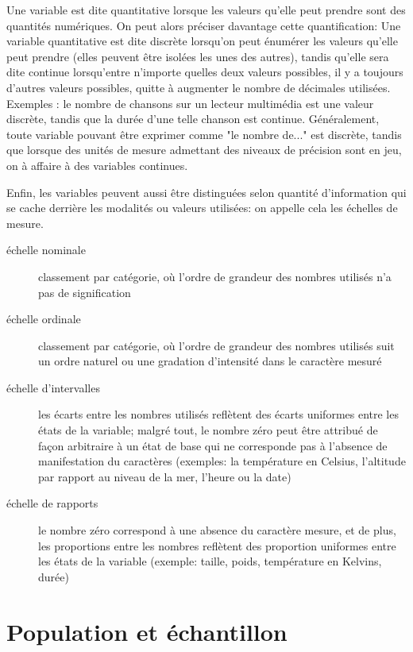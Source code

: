 \documentclass[11pt,fleqn]{book} %
\begin{document}
Une variable est dite quantitative lorsque les valeurs qu’elle peut prendre sont des quantités numériques. On peut alors préciser davantage cette quantification: 
Une variable quantitative est dite discrète lorsqu’on peut énumérer les valeurs qu’elle peut prendre (elles peuvent être isolées les unes des autres), tandis qu'elle sera dite continue lorsqu'entre n'importe quelles deux valeurs possibles, il y a toujours d'autres valeurs possibles, quitte à augmenter le nombre de décimales utilisées. 
Exemples :  le nombre de chansons sur un lecteur multimédia est une valeur discrète, tandis que la durée d’une telle chanson est continue.
Généralement, toute variable pouvant être exprimer comme "le nombre de..." est discrète, tandis que lorsque des unités de mesure admettant des niveaux de précision sont en jeu, on à affaire à des variables continues.

Enfin, les variables peuvent aussi être distinguées selon quantité d'information qui se cache derrière les modalités ou valeurs utilisées: on appelle cela les échelles de mesure. 
\begin{description}
	\item[échelle nominale] classement par catégorie, où l'ordre de grandeur
    des nombres utilisés n'a pas de signification
    \item[échelle ordinale] classement par catégorie, où l'ordre de grandeur 
    des nombres utilisés suit un ordre naturel ou une gradation d'intensité 
    dans le caractère mesuré
    \item[échelle d'intervalles] les écarts entre les nombres utilisés reflètent des écarts uniformes entre les états de la variable; malgré tout, le nombre zéro peut être attribué de façon arbitraire à un état de base qui ne corresponde pas à l'absence de manifestation du caractères (exemples: la température en Celsius, l'altitude par rapport au niveau de la mer, l'heure ou la date)
    \item[échelle de rapports] le nombre zéro correspond à une absence du caractère mesure, et de plus, les proportions entre les nombres reflètent des proportion uniformes entre les états de la variable (exemple: taille, poids, température en Kelvins, durée)
\end{description}



\section{Population et échantillon}
\end{document}

